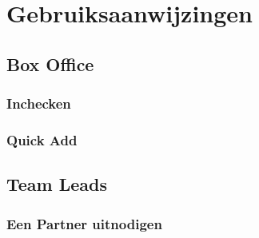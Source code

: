 \documentclass[]{memoir}
\begin{document}
\chapter{Gebruiksaanwijzingen}

\section{Box Office}
\subsection{Inchecken}
\subsection{Quick Add}

\section{Team Leads}
\subsection{Een Partner uitnodigen}
\end{document}
